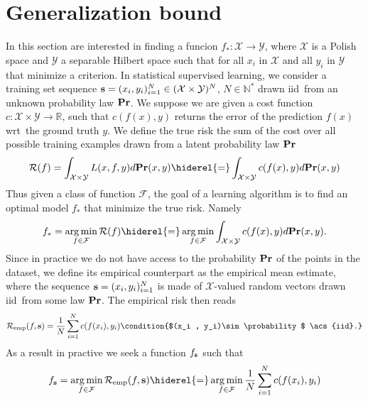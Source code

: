 \section{Generalization bound}
In this section are interested in finding a funcion
$f_*:\mathcal{X}\to\mathcal{Y}$, where $\mathcal{X}$ is a Polish space and
$\mathcal{Y}$ a separable Hilbert space such that for all $x_i$ in
$\mathcal{X}$ and all $y_i$ in $\mathcal{Y}$ that minimize a criterion. In
statistical supervised learning, we consider a training set sequence
$\boldsymbol{\mathbf{s}}=(x_i,y_i)_{i=1}^N\in(\mathcal{X}\times\mathcal{Y})^N$,
$N\in\mathbb{N^*}$ drawn \acs{iid}~from an unknown probability law
${\mathbf{{Pr}}}$. We suppose we are given a cost function
$c:\mathcal{X}\times\mathcal{Y}\to\mathbb{R}$, such that $c(f(x),y)$ returns
the error of the prediction $f(x)$ \acs{wrt}~the ground truth $y$. We define
the true risk the sum of the cost over all possible training examples drawn
from a latent probability law ${\mathbf{{Pr}}}$
\begin{dmath*}
    \risk{f}=\int_{\mathcal{X}\times\mathcal{Y}}L(x,f,y)d\probability(x,y)
    \hiderel{=}\int_{\mathcal{X}\times\mathcal{Y}}c(f(x), y)d\probability(x,y)
\end{dmath*}
Thus given a class of function $\mathcal{F}$, the goal of a learning algorithm
is to find an optimal model $f_*$ that minimize the true risk. Namely
\begin{dmath*}
    f_* = \argmin_{f\in\mathcal{F}} \risk{f}
    \hiderel{=}\argmin_{f\in\mathcal{F}}\int_{\mathcal{X}\times\mathcal{Y}}c(f(x),
    y)d\probability(x,y).
\end{dmath*}
Since in practice we do not have access to the probability ${\mathbf{{Pr}}}$ of
the points in the dataset, we define its empirical counterpart as the empirical
mean estimate, where the sequence $\boldsymbol{\mathbf{s}}=(x_i,y_i)_{i=1}^N$ is made of
$\mathcal{X}$-valued random vectors drawn \acs{iid}~from some law
${\mathbf{{Pr}}}$.
The empirical risk then reads
\begin{dmath*}
    \riskemp{f, \seq{s}}=\frac{1}{N}\sum_{i=1}^Nc(f(x_i),y_i) \condition{$(x_i
    , y_i)\sim \probability$ \acs{iid}.}
\end{dmath*}
As a result in practive we seek a function $f_{\boldsymbol{\mathbf{s}}}$ such that
\begin{dmath*}
    f_{\seq{s}} = \argmin_{f\in\mathcal{F}} \riskemp{f,\seq{s}} \hiderel{=}
    \argmin_{f\in\mathcal{F}}\frac{1}{N}\sum_{i=1}^Nc(f(x_i),y_i)
\end{dmath*}
